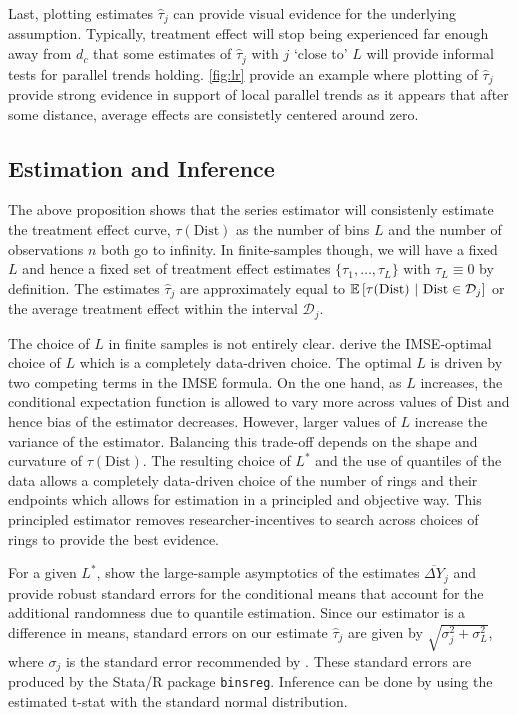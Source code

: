 \documentclass[10pt]{article}
\newcommand{\dist}{\text{Dist}}
\begin{document}
Last, plotting estimates $\hat{\tau}_j$ can provide visual evidence for the underlying  assumption. Typically, treatment effect will stop being experienced far enough away from $d_c$ that some estimates of $\hat{\tau}_j$ with $j$ `close to' $L$ will provide informal tests for parallel trends holding. \autoref{fig:lr} provide an example where plotting of $\hat{\tau}_j$ provide strong evidence in support of local parallel trends as it appears that after some distance, average effects are consistetly centered around zero. 

\subsection{Estimation and Inference}

The above proposition shows that the series estimator will consistenly estimate the treatment effect curve, $\tau(\dist)$ as the number of bins $L$ and the number of observations $n$ both go to infinity. In finite-samples though, we will have a fixed $L$ and hence a fixed set of treatment effect estimates $\{ \tau_1, \dots, \tau_{L}\}$ with $\tau_L \equiv 0$ by definition. The estimates $\hat{\tau}_j$ are approximately equal to $\condexpec{\tau(\dist)}{\dist \in \mathcal{D}_j}$ or the average treatment effect within the interval $\mathcal{D}_j$.

The choice of $L$ in finite samples is not entirely clear. \citet{Cattaneo_Crump_Farrell_Feng_2019} derive the IMSE-optimal choice of $L$ which is a completely data-driven choice. The optimal $L$ is driven by two competing terms in the IMSE formula. On the one hand, as $L$ increases, the conditional expectation function is allowed to vary more across values of $\dist$ and hence bias of the estimator decreases. However, larger values of $L$ increase the variance of the estimator. Balancing this trade-off depends on the shape and curvature of $\tau(\dist)$. The resulting choice of $L^*$ and the use of quantiles of the data allows a completely data-driven choice of the number of rings and their endpoints which allows for estimation in a principled and objective way. This principled estimator removes researcher-incentives to search across choices of rings to provide the best evidence. 

For a given $L^*$, \citet{Cattaneo_Crump_Farrell_Feng_2019} show the large-sample asymptotics of the estimates $\overline{\Delta Y}_j$ and provide robust standard errors for the conditional means that account for the additional randomness due to quantile estimation. Since our estimator is a difference in means, standard errors on our estimate $\hat{\tau}_j$ are given by $\sqrt{\sigma^2_j + \sigma^2_L}$, where $\sigma_j$ is the standard error recommended by \citet{Cattaneo_Crump_Farrell_Feng_2019}. These standard errors are produced by the Stata/R package \texttt{binsreg}. Inference can be done by using the estimated t-stat with the standard normal distribution.
\end{document}
